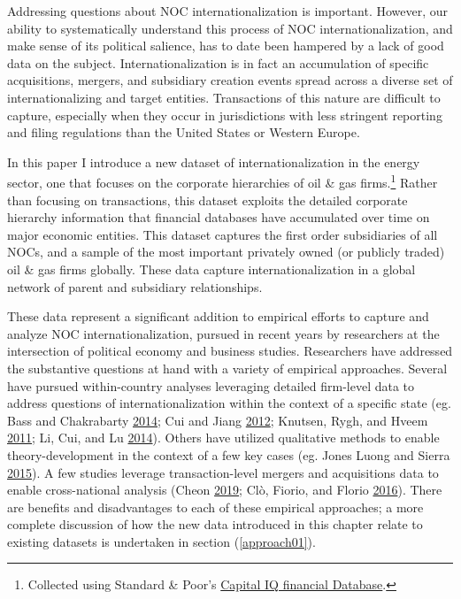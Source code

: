 \documentclass[11pt,]{book}
\begin{document}
Addressing questions about NOC internationalization is important. However, our ability to systematically understand this process of NOC internationalization, and make sense of its political salience, has to date been hampered by a lack of good data on the subject. Internationalization is in fact an accumulation of specific acquisitions, mergers, and subsidiary creation events spread across a diverse set of internationalizing and target entities. Transactions of this nature are difficult to capture, especially when they occur in jurisdictions with less stringent reporting and filing regulations than the United States or Western Europe.

In this paper I introduce a new dataset of internationalization in the energy sector, one that focuses on the corporate hierarchies of oil \& gas firms.\footnote{Collected using Standard \& Poor's \href{http://marketintelligence.spglobal.com}{Capital IQ financial Database}.} Rather than focusing on transactions, this dataset exploits the detailed corporate hierarchy information that financial databases have accumulated over time on major economic entities. This dataset captures the first order subsidiaries of all NOCs, and a sample of the most important privately owned (or publicly traded) oil \& gas firms globally. These data capture internationalization in a global network of parent and subsidiary relationships.

These data represent a significant addition to empirical efforts to capture and analyze NOC internationalization, pursued in recent years by researchers at the intersection of political economy and business studies. Researchers have addressed the substantive questions at hand with a variety of empirical approaches. Several have pursued within-country analyses leveraging detailed firm-level data to address questions of internationalization within the context of a specific state (eg. Bass and Chakrabarty \protect\hyperlink{ref-bass_resource_2014}{2014}; Cui and Jiang \protect\hyperlink{ref-cui_state_2012}{2012}; Knutsen, Rygh, and Hveem \protect\hyperlink{ref-knutsen_does_2011}{2011}; Li, Cui, and Lu \protect\hyperlink{ref-li_varieties_2014}{2014}). Others have utilized qualitative methods to enable theory-development in the context of a few key cases (eg. Jones Luong and Sierra \protect\hyperlink{ref-jones_luong_domestic_2015}{2015}). A few studies leverage transaction-level mergers and acquisitions data to enable cross-national analysis (Cheon \protect\hyperlink{ref-cheon_developing_2019}{2019}; Clò, Fiorio, and Florio \protect\hyperlink{ref-clo_targets_2016}{2016}). There are benefits and disadvantages to each of these empirical approaches; a more complete discussion of how the new data introduced in this chapter relate to existing datasets is undertaken in section (\ref{approach01}).
\end{document}
